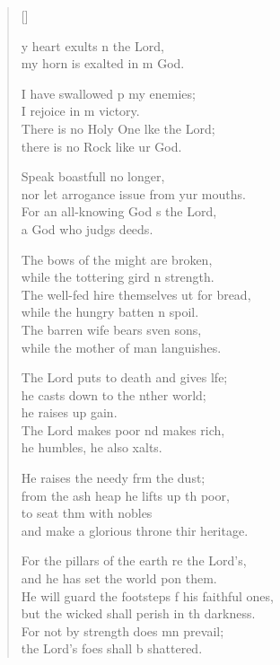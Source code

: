 \settowidth{\versewidth}{He will guard the footsteps of his faithful ones *}
\begin{verse}[\versewidth]
  \begin{patverse}
    y heart exults \pointup{\i}n the Lord,\Med\\
my horn is exalted in m God.

I have swallowed p my enemies;\Med\\
I rejoice in m victory.\\
There is no Holy One l\pointup{\i}ke the Lord;\Med\\
there is no Rock like ur God.

Speak boastfull no longer,\Med\\
nor let arrogance issue from yur mouths.\\
For an all-knowing God \pointup{\i}s the Lord,\Med\\
a God who judgs deeds.

The bows of the might are broken,\Med\\
while the tottering gird n strength.\\
The well-fed hire themselves ut for bread,\Med\\
while the hungry batten n spoil.\\
The barren wife bears sven sons,\Med\\
while the mother of man languishes.

The Lord puts to death and gives l\pointup{\i}fe;\Flex\\
he casts down to the nther world;\Med\\
he raises up gain.\\
The Lord makes poor nd makes rich,\Med\\
he humbles, he also xalts.

He raises the needy frm the dust;\Med\\
from the ash heap he lifts up th poor,\\
to seat thm with nobles\Med\\
and make a glorious throne thir heritage.

For the pillars of the earth re the Lord’s,\Med\\
and he has set the world pon them.\\
He will guard the footsteps f his faithful ones,\Med\\
but the wicked shall perish in th darkness.\\
For not by strength does mn prevail;\Med\\
the Lord’s foes shall b shattered.


\end{patverse}
\end{verse}
